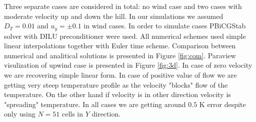 \documentclass{article}
\begin{document}
Three separate cases are considered in total: no wind case and two cases with moderate velocity up and down the hill.
In our simulations we assumed $D_T  = 0.01$ and $u_y = \pm 0.1$ in wind cases. 
In order to simulate cases PBiCGStab solver with DILU preconditioner were used. All numerical schemes used simple linear interpolations together with 
Euler time scheme. Comparison between numerical and analitical solutions is presented in Figure \ref{fig:com}. 
Paraview visulization of upwind case is presented in Figure \ref{fig:3d}. In case of zero velocity we are recovering simple linear form. In case of positive value of flow we are getting very steep 
temperature profile as the velocity "blocks" flow of the temperature. On the other hand if velocity is in other direction velocity is "spreading" temperature.
In all cases we are getting around $0.5$ K error despite only using $N = 51$ cells in $Y$ direction.
\end{document}
